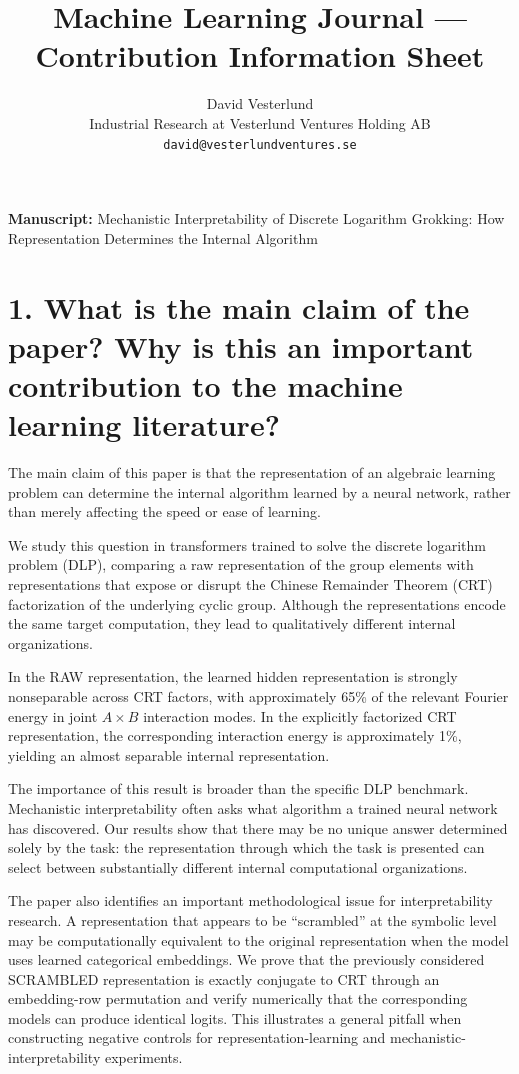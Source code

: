 \documentclass[9pt,a4paper]{extarticle}
\title{Machine Learning Journal --- Contribution Information Sheet}
\author{David Vesterlund \\
Industrial Research at Vesterlund Ventures Holding AB \\
\texttt{david@vesterlundventures.se}}
\date{}
\begin{document}
\maketitle

\noindent\textbf{Manuscript:} Mechanistic Interpretability of Discrete Logarithm Grokking: How Representation Determines the Internal Algorithm

\medskip

\section*{1. What is the main claim of the paper? Why is this an important contribution to the machine learning literature?}

The main claim of this paper is that the representation of an algebraic learning problem can determine the internal algorithm learned by a neural network, rather than merely affecting the speed or ease of learning.

We study this question in transformers trained to solve the discrete logarithm problem (DLP), comparing a raw representation of the group elements with representations that expose or disrupt the Chinese Remainder Theorem (CRT) factorization of the underlying cyclic group. Although the representations encode the same target computation, they lead to qualitatively different internal organizations.

In the RAW representation, the learned hidden representation is strongly nonseparable across CRT factors, with approximately 65\% of the relevant Fourier energy in joint $A \times B$ interaction modes. In the explicitly factorized CRT representation, the corresponding interaction energy is approximately 1\%, yielding an almost separable internal representation.

The importance of this result is broader than the specific DLP benchmark. Mechanistic interpretability often asks what algorithm a trained neural network has discovered. Our results show that there may be no unique answer determined solely by the task: the representation through which the task is presented can select between substantially different internal computational organizations.

The paper also identifies an important methodological issue for interpretability research. A representation that appears to be ``scrambled'' at the symbolic level may be computationally equivalent to the original representation when the model uses learned categorical embeddings. We prove that the previously considered SCRAMBLED representation is exactly conjugate to CRT through an embedding-row permutation and verify numerically that the corresponding models can produce identical logits. This illustrates a general pitfall when constructing negative controls for representation-learning and mechanistic-interpretability experiments.
\end{document}
